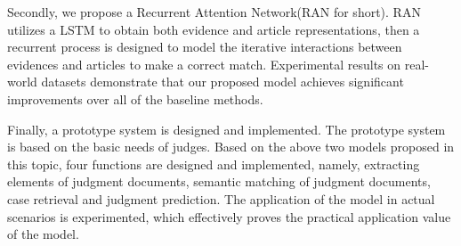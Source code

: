 \begin{eabstract}
Secondly, we propose a Recurrent Attention Network(RAN for short). RAN utilizes a LSTM to obtain both evidence and article representations, then a recurrent process is designed to model the iterative interactions between evidences and articles to make a correct match. Experimental results on real-world datasets demonstrate that our proposed model achieves significant improvements over all of the baseline methods.

Finally, a prototype system is designed and implemented. The prototype system is based on the basic needs of judges. Based on the above two models proposed in this topic, four functions are designed and implemented, namely, extracting elements of judgment documents, semantic matching of judgment documents, case retrieval and judgment prediction. The application of the model in actual scenarios is experimented, which effectively proves the practical application value of the model.

\end{eabstract}